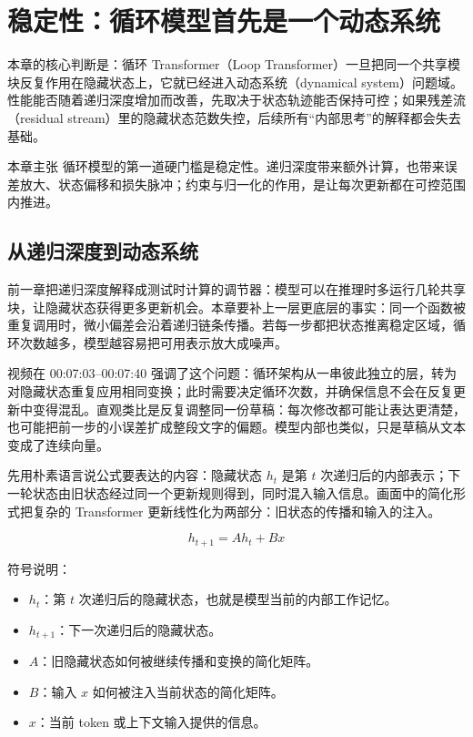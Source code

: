 \section{稳定性：循环模型首先是一个动态系统}
\label{sec:stability-dynamical-system}

本章的核心判断是：循环 Transformer（Loop Transformer）一旦把同一个共享模块反复作用在隐藏状态上，它就已经进入动态系统（dynamical system）问题域。性能能否随着递归深度增加而改善，先取决于状态轨迹能否保持可控；如果残差流（residual stream）里的隐藏状态范数失控，后续所有“内部思考”的解释都会失去基础。

\begin{importantbox}{本章主张}
循环模型的第一道硬门槛是稳定性。递归深度带来额外计算，也带来误差放大、状态偏移和损失脉冲；约束与归一化的作用，是让每次更新都在可控范围内推进。
\end{importantbox}

\subsection{从递归深度到动态系统}

前一章把递归深度解释成测试时计算的调节器：模型可以在推理时多运行几轮共享块，让隐藏状态获得更多更新机会。本章要补上一层更底层的事实：同一个函数被重复调用时，微小偏差会沿着递归链条传播。若每一步都把状态推离稳定区域，循环次数越多，模型越容易把可用表示放大成噪声。

视频在 00:07:03--00:07:40 强调了这个问题：循环架构从一串彼此独立的层，转为对隐藏状态重复应用相同变换；此时需要决定循环次数，并确保信息不会在反复更新中变得混乱。直观类比是反复调整同一份草稿：每次修改都可能让表达更清楚，也可能把前一步的小误差扩成整段文字的偏题。模型内部也类似，只是草稿从文本变成了连续向量。

先用朴素语言说公式要表达的内容：隐藏状态 \(h_t\) 是第 \(t\) 次递归后的内部表示；下一轮状态由旧状态经过同一个更新规则得到，同时混入输入信息。画面中的简化形式把复杂的 Transformer 更新线性化为两部分：旧状态的传播和输入的注入。

\[
h_{t+1}=Ah_t+Bx
\]

符号说明：
\begin{itemize}
  \item \(h_t\)：第 \(t\) 次递归后的隐藏状态，也就是模型当前的内部工作记忆。
  \item \(h_{t+1}\)：下一次递归后的隐藏状态。
  \item \(A\)：旧隐藏状态如何被继续传播和变换的简化矩阵。
  \item \(B\)：输入 \(x\) 如何被注入当前状态的简化矩阵。
  \item \(x\)：当前 token 或上下文输入提供的信息。
\end{itemize}

